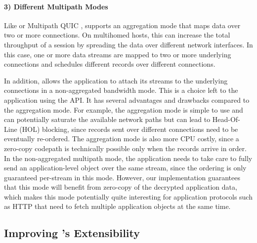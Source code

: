 \paragraph*{3) Different Multipath Modes}
Like \mptcp \cite{raiciu2012hard,rfc6824} or Multipath QUIC \cite{de2017multipath,draft-liu-multipath-quic-02}, \tcpls supports an aggregation mode that maps data over two or more \tcp connections. On multihomed hosts, this can increase the total throughput of a \tcpls session by spreading the data over different network interfaces. In this case, one or more data streams are mapped to two or more underlying \tcp connections and \tcpls schedules different records over different connections.

In addition, \tcpls allows the application to attach its streams to the
underlying \tcp connections in a non-aggregated bandwidth mode. This is a choice left to the application using the API. It has several advantages and drawbacks compared to the aggregation mode. For example, the aggregation mode is simple to use and can potentially saturate the available network paths but can lead to Head-Of-Line (HOL) blocking, since records sent over different \tcp connections need to be eventually re-ordered. The aggregation mode is also more CPU costly, since a zero-copy codepath is technically possible only when the records arrive in order. In the non-aggregated multipath mode, the application needs to take care to fully send an application-level object over the same stream, since the ordering is only guaranteed per-stream in this mode. However, our \tcpls implementation guarantees that this mode will benefit from zero-copy of the decrypted application data, which makes this mode potentially quite interesting for application protocols such as HTTP that need to fetch multiple application objects at the same time.

\subsection{Improving \tcp's Extensibility}

